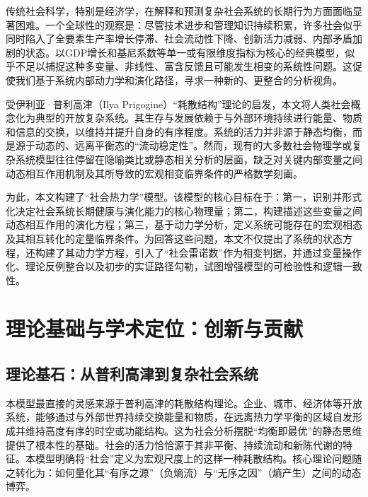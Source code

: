\documentclass[twocolumn]{ctexart}
\begin{document}
传统社会科学，特别是经济学，在解释和预测复杂社会系统的长期行为方面面临显著困难。一个全球性的观察是：尽管技术进步和管理知识持续积累，许多社会似乎同时陷入了全要素生产率增长停滞、社会流动性下降、创新活力减弱、内部矛盾加剧的状态。以GDP增长和基尼系数等单一或有限维度指标为核心的经典模型，似乎不足以捕捉这种多变量、非线性、富含反馈且可能发生相变的系统性问题。这促使我们基于系统内部动力学和演化路径，寻求一种新的、更整合的分析视角。

受伊利亚·普利高津（Ilya Prigogine）“耗散结构”理论\cite{prigogine1987chaos,prigogine1967thermodynamics}的启发，本文将人类社会概念化为典型的开放复杂系统。其生存与发展依赖于与外部环境持续进行能量、物质和信息的交换，以维持并提升自身的有序程度。系统的活力并非源于静态均衡，而是源于动态的、远离平衡态的“流动稳定性”。然而，现有的大多数社会物理学或复杂系统模型往往停留在隐喻类比或静态相关分析的层面，缺乏对关键内部变量之间动态相互作用机制及其所导致的宏观相变临界条件的严格数学刻画。

为此，本文构建了“社会热力学”模型。该模型的核心目标在于：第一，识别并形式化决定社会系统长期健康与演化能力的核心物理量；第二，构建描述这些变量之间动态相互作用的演化方程；第三，基于动力学分析，定义系统可能存在的宏观相态及其相互转化的定量临界条件。为回答这些问题，本文不仅提出了系统的状态方程，还构建了其动力学方程，引入了“社会雷诺数”作为相变判据，并通过变量操作化、理论反例整合以及初步的实证路径勾勒，试图增强模型的可检验性和逻辑一致性。

\section{理论基础与学术定位：创新与贡献}

\subsection{理论基石：从普利高津到复杂社会系统}

本模型最直接的灵感来源于普利高津的耗散结构理论。企业、城市、经济体等开放系统，能够通过与外部世界持续交换能量和物质，在远离热力学平衡的区域自发形成并维持高度有序的时空或功能结构\cite{prigogine1987chaos,prigogine1967thermodynamics}。这为社会分析摆脱“均衡即最优”的静态思维提供了根本性的基础。社会的活力恰恰源于其非平衡、持续流动和新陈代谢的特征。本模型明确将“社会”定义为宏观尺度上的这样一种耗散结构。核心理论问题随之转化为：如何量化其“有序之源”（负熵流）与“无序之因”（熵产生）之间的动态博弈。
\end{document}
